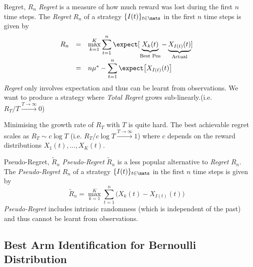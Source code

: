 \documentclass[11pt,a4paper]{article}
\begin{document}
\begin{definition}{Regret, $R_n$}
  \textit{Regret} is a measure of how much reward was lost during the first $n$ time steps. The \textit{Regret} $R_n$ of a strategy $\{I(t)\}_{t\in\nats}$ in the first $n$ time steps is given by
  \[\begin{array}{rcl}
    R_n&=&{\displaystyle \max\limits_{k=1}^K\sum_{t=1}^n \expect[\underbrace{X_k(t)}_\text{Best Pos}-\underbrace{X_{I(t)}(t)}_\text{Actual}]}\\
    &=&n\mu^*-{\displaystyle\sum_{t=1}^n\expect\big[X_{I(t)}(t)\big]}
  \end{array}\]
  \textit{Regret} only involves expectation and thus can be learnt from observations. We want to produce a strategy where \textit{Total Regret} grows sub-linearly.(i.e. $R_T/T\overset{T\to\infty}\longrightarrow0$)
\end{definition}

\begin{remark}{Minimising the growth rate of $R_T$ with $T$ is quite hard.}
  The best achievable regret scales as $R_T\sim c\log T$ (i.e. $R_T/c\log T\overset{T\to\infty}\longrightarrow1$) where $c$ depends on the reward distributions $X_1(t),\dots,X_K(t)$.
\end{remark}

\begin{definition}{Pseudo-Regret, $\tilde{R}_n$}
  \textit{Pseudo-Regret} $\tilde{R}_n$ is a less popular alternative to \textit{Regret} $R_n$.
  The \textit{Pseudo-Regret} $R_n$ of a strategy $\{I(t)\}_{t\in\nats}$ in the first $n$ time steps is given by
  \[ \tilde{R}_n=\max\limits_{k=1}^K\sum_{t=1}^n\big(X_k(t)-X_{I(t)}(t)\big) \]
  \textit{Pseudo-Regret} includes intrinsic randomness (which is independent of the past) and thus cannot be learnt from observations.
\end{definition}

\subsection{Best Arm Identification for Bernoulli Distribution}
\end{document}
